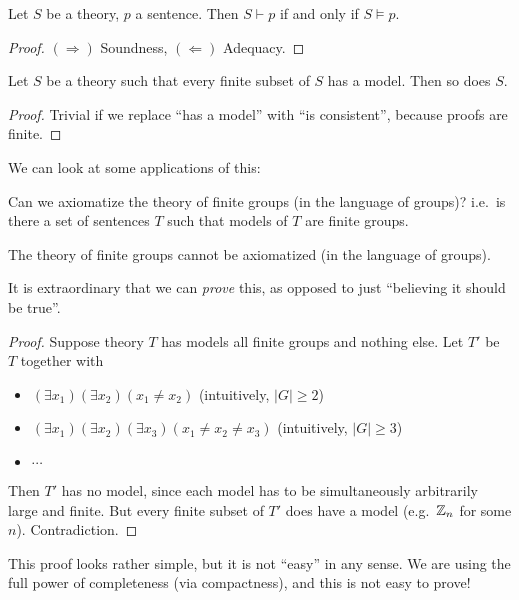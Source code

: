 \documentclass[a4paper]{article}
\begin{document}
\begin{thm}
  Let $S$ be a theory, $p$ a sentence. Then $S\vdash p$ if and only if $S \models p$.
\end{thm}

\begin{proof}
  $(\Rightarrow)$ Soundness, $(\Leftarrow)$ Adequacy.
\end{proof}

\begin{cor}
  Let $S$ be a theory such that every finite subset of $S$ has a model. Then so does $S$.
\end{cor}

\begin{proof}
  Trivial if we replace ``has a model'' with ``is consistent'', because proofs are finite.
\end{proof}

We can look at some applications of this:

Can we axiomatize the theory of finite groups (in the language of groups)? i.e.\ is there a set of sentences $T$ such that models of $T$ are finite groups.

\begin{cor}
  The theory of finite groups cannot be axiomatized (in the language of groups).
\end{cor}
It is extraordinary that we can \emph{prove} this, as opposed to just ``believing it should be true''.

\begin{proof}
  Suppose theory $T$ has models all finite groups and nothing else. Let $T'$ be $T$ together with
  \begin{itemize}
    \item $(\exists x_1)(\exists x_2)(x_1 \not = x_2)$ (intuitively, $|G| \geq 2$)
    \item $(\exists x_1)(\exists x_2)(\exists x_3)(x_1 \not= x_2 \not= x_3)$ (intuitively, $|G| \geq 3$)
    \item $\cdots$
  \end{itemize}
  Then $T'$ has no model, since each model has to be simultaneously arbitrarily large and finite. But every finite subset of $T'$ does have a model (e.g.\ $\mathbb{Z}_n$ for some $n$). Contradiction.
\end{proof}
This proof looks rather simple, but it is not ``easy'' in any sense. We are using the full power of completeness (via compactness), and this is not easy to prove!
\end{document}
